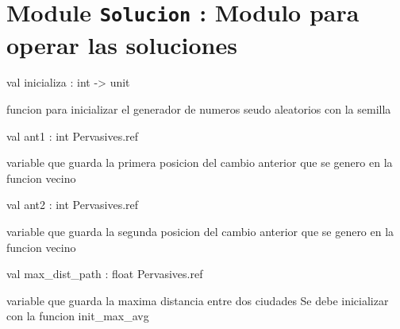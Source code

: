 \documentclass[11pt]{article}
\begin{document}
\section{Module {\tt{Solucion}} : Modulo para operar las soluciones}
\label{module:Solucion}




\ocamldocvspace{0.5cm}



\label{val:Solucion.inicializa}\begin{ocamldoccode}
val inicializa : int -> unit
\end{ocamldoccode}
\begin{ocamldocdescription}
funcion para inicializar el generador de numeros seudo aleatorios con la semilla


\end{ocamldocdescription}




\label{val:Solucion.ant1}\begin{ocamldoccode}
val ant1 : int Pervasives.ref
\end{ocamldoccode}
\begin{ocamldocdescription}
variable que guarda la primera posicion del cambio anterior que se genero
en la funcion vecino


\end{ocamldocdescription}




\label{val:Solucion.ant2}\begin{ocamldoccode}
val ant2 : int Pervasives.ref
\end{ocamldoccode}
\begin{ocamldocdescription}
variable que guarda la segunda posicion del cambio anterior que se genero
en la funcion vecino


\end{ocamldocdescription}




\label{val:Solucion.max-underscoredist-underscorepath}\begin{ocamldoccode}
val max_dist_path : float Pervasives.ref
\end{ocamldoccode}
\begin{ocamldocdescription}
variable que guarda la maxima distancia entre dos ciudades
Se debe inicializar con la funcion init\_max\_avg


\end{ocamldocdescription}
\end{document}
